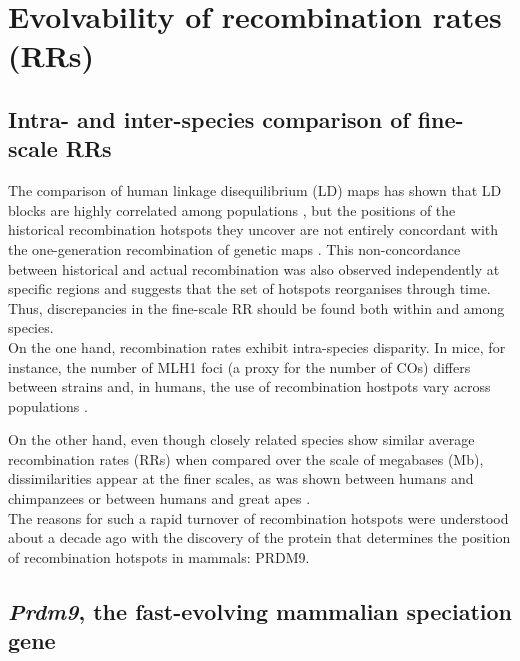 \section{Evolvability of recombination rates (RRs)}

\subsection{Intra- and inter-species comparison of fine-scale RRs}

The comparison of human linkage disequilibrium (LD) maps has shown that LD blocks are highly correlated among populations \citep{gabriel2002structure}, but the positions of the historical recombination hotspots they uncover are not entirely concordant with the one-generation recombination of genetic maps \citep{tapper2005map}. 
This non-concordance between historical and actual recombination was also observed independently at specific regions \citep{jeffreys2005human,kauppi2005localized} and suggests that the set of hotspots reorganises through time.
Thus, discrepancies in the fine-scale RR should be found both within and among species.\\

On the one hand, recombination rates exhibit intra-species disparity.
In mice, for instance, the number of MLH1 foci (a proxy for the number of COs) differs between strains \citep{koehler2002genetic,paigen2008recombinational,baier2014variation} and, in humans, the use of recombination hostpots vary across populations \citep{berg2011variants,hinch2011landscape}.

On the other hand, even though closely related species show similar average recombination rates (RRs) \citep{dumont2008evolution,hassold2009cytological,garcia-cruz2011comparative,auton2012finescale} when compared over the scale of megabases (Mb), dissimilarities appear at the finer scales, as was shown between humans and chimpanzees \citep{ptak2005finescale,winckler2005comparison} or between humans and great apes \citep{stevison2016time}.\\

The reasons for such a rapid turnover of recombination hotspots were understood about a decade ago with the discovery of the protein that determines the position of recombination hotspots in mammals: PRDM9.


\subsection{\textit{Prdm9}, the fast-evolving mammalian speciation gene}

